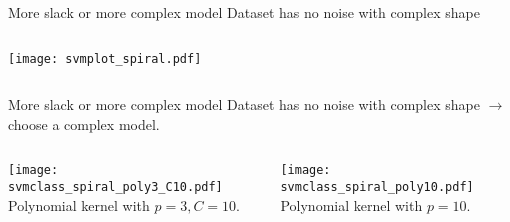 \documentclass[unknownkeysallowed,10pt]{beamer}
\theoremstyle{definition} \newtheorem{rem}[thm]{Remark} \newtheorem*{rem*}{Remark}
\begin{document}
\begin{frame}{More slack or more complex model}
\vskip6pt
Dataset has no noise with complex shape\\
\begin{columns}
\begin{column}{.5\textwidth}
\centering
\texttt{[image: svmplot\_spiral.pdf]}
\end{column}
\begin{column}{.5\textwidth}

\end{column}
\end{columns}
\end{frame}

\begin{frame}[noframenumbering]{More slack or more complex model}
\vskip6pt
Dataset has no noise with complex shape $\rightarrow$ choose a complex model.\\
\begin{columns}
\begin{column}{.5\textwidth}
\centering
\texttt{[image: svmclass\_spiral\_poly3\_C10.pdf]}\\
Polynomial kernel with $p = 3, C = 10$.
\end{column}
\begin{column}{.5\textwidth}
\centering
\texttt{[image: svmclass\_spiral\_poly10.pdf]}\\
Polynomial kernel with $p = 10$.
\end{column}
\end{columns}
\end{frame}
\end{document}
